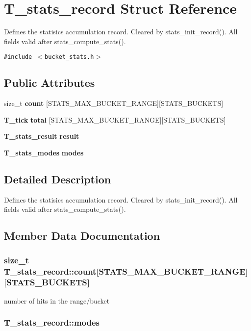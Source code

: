 \section{T\_\-stats\_\-record Struct Reference}
\label{structT__stats__record}
Defines the statisics accumulation record. Cleared by stats\_\-init\_\-record(). All fields valid after stats\_\-compute\_\-stats(). 


{\tt \#include $<$bucket\_\-stats.h$>$}

\subsection*{Public Attributes}
\begin{CompactItemize}
\item 
size\_\-t {\bf count} [STATS\_\-MAX\_\-BUCKET\_\-RANGE][STATS\_\-BUCKETS]
\item 
{\bf T\_\-tick} {\bf total} [STATS\_\-MAX\_\-BUCKET\_\-RANGE][STATS\_\-BUCKETS]
\item 
{\bf T\_\-stats\_\-result} {\bf result}
\item 
{\bf T\_\-stats\_\-modes} {\bf modes}
\end{CompactItemize}


\subsection{Detailed Description}
Defines the statisics accumulation record. Cleared by stats\_\-init\_\-record(). All fields valid after stats\_\-compute\_\-stats().



\subsection{Member Data Documentation}
\subsubsection{\setlength{\rightskip}{0pt plus 5cm}size\_\-t T\_\-stats\_\-record::count[STATS\_\-MAX\_\-BUCKET\_\-RANGE][STATS\_\-BUCKETS]}\label{structT__stats__record_m0}


number of hits in the range/bucket 
\subsubsection{ T\_\-stats\_\-record::modes}\label{structT__stats__record_m3}


